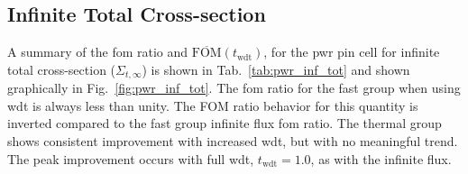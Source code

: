 \subsection{Infinite Total Cross-section}
\label{sec:pwr_inf_total}
A summary of the \gls{fom} ratio and
$\overline{\mathrm{FOM}}(t_{\mathrm{wdt}})$, for the \gls{pwr} pin
cell for infinite total cross-section ($\Sigma_{t,
  \infty}$) is shown in Tab.~\ref{tab:pwr_inf_tot} and shown
graphically in Fig.~\ref{fig:pwr_inf_tot}. The \gls{fom} ratio for the
fast group when using \gls{wdt} is always less than unity. The FOM ratio behavior for this quantity is inverted compared to the fast group infinite flux \gls{fom}
ratio. The thermal group shows consistent improvement with increased \gls{wdt}, but
with no meaningful trend. The peak improvement occurs with full
\gls{wdt}, $t_{\mathrm{wdt}} = 1.0$, as with the infinite flux.

